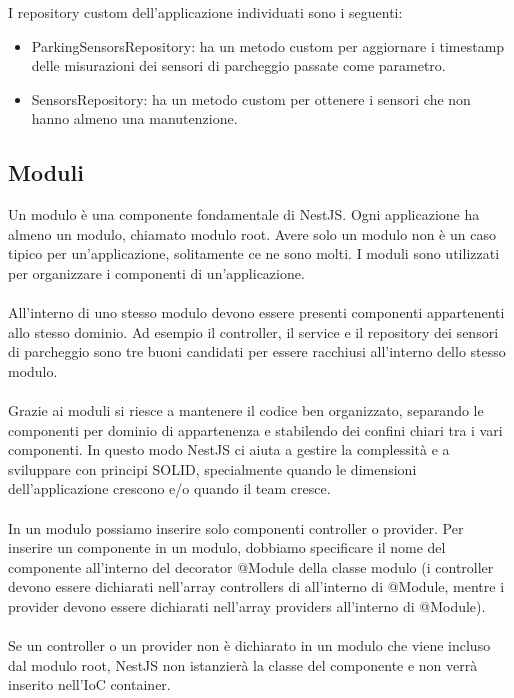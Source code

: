 \leavevmode\newline
I repository custom dell'applicazione individuati sono i seguenti:
\begin{itemize}
    \item ParkingSensorsRepository: ha un metodo custom per aggiornare i timestamp delle misurazioni dei sensori di parcheggio 
        passate come parametro.
    \item SensorsRepository: ha un metodo custom per ottenere i sensori che non hanno almeno una manutenzione.
\end{itemize}

\subsection{Moduli}
Un modulo è una componente fondamentale di NestJS. Ogni applicazione ha almeno un modulo, chiamato modulo root. 
Avere solo un modulo non è un caso tipico per un'applicazione, solitamente ce ne sono molti.
I moduli sono utilizzati per organizzare i componenti di un'applicazione.
\\\\
All'interno di uno stesso modulo devono essere presenti componenti appartenenti allo stesso dominio. Ad esempio
il controller, il service e il repository dei sensori di parcheggio sono tre buoni candidati per essere racchiusi 
all'interno dello stesso modulo.
\\\\
Grazie ai moduli si riesce a mantenere il codice ben organizzato, separando le componenti per dominio di appartenenza
e stabilendo dei confini chiari tra i vari componenti. In questo modo NestJS ci aiuta a gestire la complessità e a 
sviluppare con principi SOLID, specialmente quando le dimensioni dell'applicazione crescono e/o quando il team cresce.
\\\\
In un modulo possiamo inserire solo componenti controller o provider. Per inserire un componente in un modulo, dobbiamo
specificare il nome del componente all'interno del decorator
@Module della classe modulo (i controller devono essere dichiarati nell'array controllers di all'interno di @Module,
mentre i provider devono essere dichiarati nell'array providers all'interno di @Module). 
\\\\
Se un controller o un provider non è dichiarato in un modulo che viene incluso dal modulo
root, NestJS non istanzierà la classe del componente e non verrà inserito nell'IoC container.
